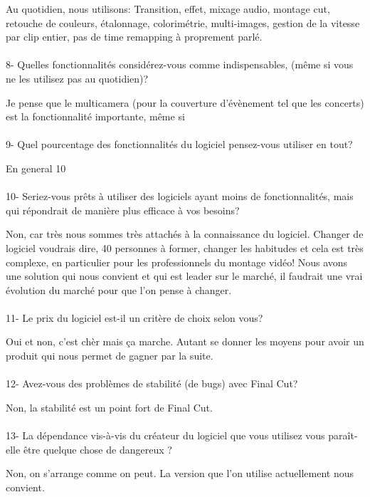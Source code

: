 Au quotidien, nous utilisons: Transition, effet, mixage audio, montage cut,
retouche de couleurs, étalonnage, colorimétrie, multi-images, gestion de la
vitesse par clip entier, pas de time remapping à proprement parlé.

\paragraph{}
8-  Quelles fonctionnalités considérez-vous comme indispensables, (même si vous
ne les utilisez pas au quotidien)?

Je pense que le multicamera (pour la couverture d'évènement tel que les
concerts) est la fonctionnalité importante, même si %

\paragraph{}
9- Quel pourcentage des fonctionnalités du logiciel pensez-vous utiliser
en tout?

En general 10%

\paragraph{}
10- Seriez-vous prêts à utiliser des logiciels ayant moins de
fonctionnalités, mais qui répondrait de manière plus efficace
à vos besoins?

Non, car très nous sommes très attachés à la connaissance du logiciel.
Changer de logiciel voudrais dire, 40 personnes à former, changer les
habitudes et cela est très complexe, en particulier pour les professionnels
du montage vidéo! Nous avons une solution qui nous convient et qui est leader
sur le marché, il faudrait une vrai évolution du marché pour que l'on pense à
changer.

\paragraph{}
11-  Le prix du logiciel est-il un critère de choix selon vous?

Oui et non, c'est chèr mais ça marche. Autant se donner les moyens pour avoir
un produit qui nous permet de gagner par la suite.

\paragraph{}
12- Avez-vous des problèmes de stabilité (de bugs) avec Final Cut?

Non, la stabilité est un point fort de Final Cut.

\paragraph{}
13- La dépendance vis-à-vis du créateur du logiciel que vous utilisez
vous paraît-elle être quelque chose de dangereux ?

Non, on s'arrange comme on peut. La version que l'on utilise actuellement
nous convient. %

